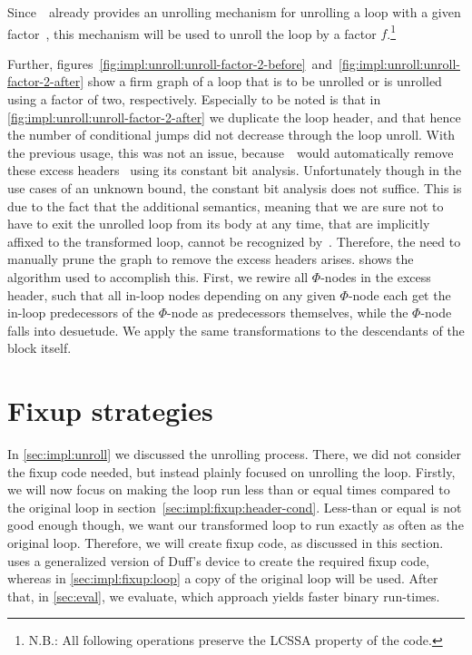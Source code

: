 Since~\libFIRM~already provides an unrolling mechanism for unrolling a loop with a given factor~\cite{aebi18bachelorarbeit}, this mechanism will be used to unroll the loop by a factor $f$.\footnote{N.B.: All following operations preserve the LCSSA property of the code.}

Further, figures~\ref{fig:impl:unroll:unroll-factor-2-before}~and~\ref{fig:impl:unroll:unroll-factor-2-after} show a firm graph of a loop that is to be unrolled or is unrolled using a factor of two, respectively.
Especially to be noted is that in \cref{fig:impl:unroll:unroll-factor-2-after} we duplicate the loop header, and that hence the number of conditional jumps did not decrease through the loop unroll.
With the previous usage, this was not an issue, because~\libFIRM~would automatically remove these excess headers~\cite{aebi18bachelorarbeit} using its constant bit analysis.
Unfortunately though in the use cases of an unknown bound, the constant bit analysis does not suffice.
This is due to the fact that the additional semantics, meaning that we are sure not to have to exit the unrolled loop from its body at any time, that are implicitly affixed to the transformed loop, cannot be recognized by~\libFIRM.
Therefore, the need to manually prune the graph to remove the excess headers arises.
 shows the algorithm used to accomplish this.
First, we rewire all $\Phi$-nodes in the excess header, such that all in-loop nodes depending on any given $\Phi$-node each get the in-loop predecessors of the $\Phi$-node as predecessors themselves, while the $\Phi$-node falls into desuetude.
We apply the same transformations to the descendants of the block itself.







\section{Fixup strategies}\label{sec:impl:fixup}

In \cref{sec:impl:unroll} we discussed the unrolling process.
There, we did not consider the fixup code needed, but instead plainly focused on unrolling the loop.
Firstly, we will now focus on making the loop run less than or equal times compared to the original loop in section~\cref{sec:impl:fixup:header-cond}.
Less-than or equal is not good enough though, we want our transformed loop to run exactly as often as the original loop.
Therefore, we will create fixup code, as discussed in this section.
 uses a generalized version of Duff's device to create the required fixup code, whereas in \cref{sec:impl:fixup:loop} a copy of the original loop will be used.
After that, in \cref{sec:eval}, we evaluate, which approach yields faster binary run-times.

